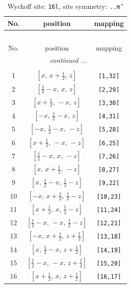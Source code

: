 \documentclass[fleqn,8pt]{jsarticle}
\begin{document}
\renewcommand{\arraystretch}{1.2}
\begin{longtable}{ccc}
\caption{Wyckoff site: {\tt 16l}, site symmetry: {\tt ..m'}}
 \\
 \hline \hline
No. & position & mapping \\ \hline \endfirsthead

\multicolumn{2}{l}{\tablename\ \thetable{}} \\
 \hline \hline
No. & position & mapping \\ \hline \endhead

 \hline \hline
\multicolumn{2}{r}{\footnotesize\it continued ...} \\ \endfoot

 \hline \hline
\multicolumn{2}{r}{} \\ \endlastfoot

1 & $\left[ x,\, x + \frac{1}{2},\, z \right]$ & {\tt [1,32]} \\ \hline
2 & $\left[ \frac{1}{2} - x,\, x,\, z \right]$ & {\tt [2,29]} \\ \hline
3 & $\left[ x + \frac{1}{2},\, - x,\, z \right]$ & {\tt [3,30]} \\ \hline
4 & $\left[ - x,\, \frac{1}{2} - x,\, z \right]$ & {\tt [4,31]} \\ \hline
5 & $\left[ - x,\, \frac{1}{2} - x,\, - z \right]$ & {\tt [5,28]} \\ \hline
6 & $\left[ x + \frac{1}{2},\, - x,\, - z \right]$ & {\tt [6,25]} \\ \hline
7 & $\left[ \frac{1}{2} - x,\, x,\, - z \right]$ & {\tt [7,26]} \\ \hline
8 & $\left[ x,\, x + \frac{1}{2},\, - z \right]$ & {\tt [8,27]} \\ \hline
9 & $\left[ x,\, \frac{1}{2} - x,\, \frac{1}{2} - z \right]$ & {\tt [9,22]} \\ \hline
10 & $\left[ - x,\, x + \frac{1}{2},\, \frac{1}{2} - z \right]$ & {\tt [10,23]} \\ \hline
11 & $\left[ x + \frac{1}{2},\, x,\, \frac{1}{2} - z \right]$ & {\tt [11,24]} \\ \hline
12 & $\left[ \frac{1}{2} - x,\, - x,\, \frac{1}{2} - z \right]$ & {\tt [12,21]} \\ \hline
13 & $\left[ - x,\, x + \frac{1}{2},\, z + \frac{1}{2} \right]$ & {\tt [13,18]} \\ \hline
14 & $\left[ x,\, \frac{1}{2} - x,\, z + \frac{1}{2} \right]$ & {\tt [14,19]} \\ \hline
15 & $\left[ \frac{1}{2} - x,\, - x,\, z + \frac{1}{2} \right]$ & {\tt [15,20]} \\ \hline
16 & $\left[ x + \frac{1}{2},\, x,\, z + \frac{1}{2} \right]$ & {\tt [16,17]} \\
\end{longtable}
\end{document}
